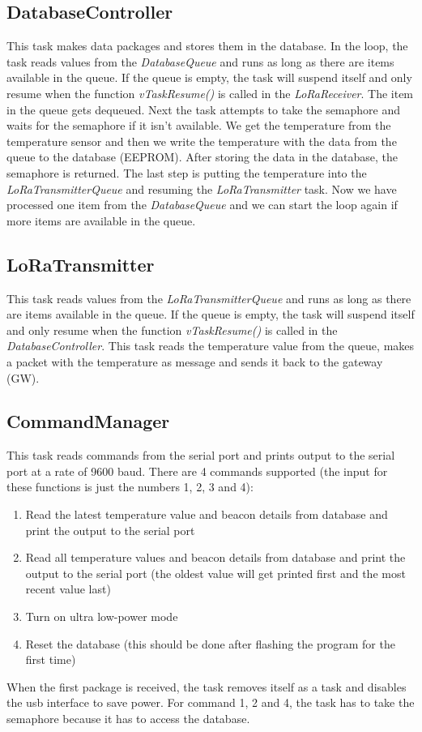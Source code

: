 \documentclass{scrartcl}
\begin{document}
\subsection{DatabaseController}
This task makes data packages and stores them in the database.
In the loop, the task reads values from the \textit{DatabaseQueue} and runs as long as there are items available in the queue.
If the queue is empty, the task will suspend itself and only resume when the function \textit{vTaskResume()} is called in the \textit{LoRaReceiver}.
The item in the queue gets dequeued. Next the task attempts to take the semaphore and waits for the semaphore if it isn't available.
We get the temperature from the temperature sensor and then we write the temperature with the data from the queue to the database (EEPROM).
After storing the data in the database, the semaphore is returned.
The last step is putting the temperature into the \textit{LoRaTransmitterQueue} and resuming the \textit{LoRaTransmitter} task.
Now we have processed one item from the \textit{DatabaseQueue} and we can start the loop again if more items are available in the queue.

\newpage

\subsection{LoRaTransmitter}
This task reads values from the \textit{LoRaTransmitterQueue} and runs as long as there are items available in the queue.
If the queue is empty, the task will suspend itself and only resume when the function \textit{vTaskResume()} is called in the \textit{DatabaseController}.
This task reads the temperature value from the queue, makes a packet with the temperature as message and sends it back to the gateway (GW).

\subsection{CommandManager}
This task reads commands from the serial port and prints output to the serial port at a rate of 9600 baud.
There are 4 commands supported (the input for these functions is just the numbers 1, 2, 3 and 4):
\begin{enumerate}
    \item Read the latest temperature value and beacon details from database and print the output to the serial port
    \item Read all temperature values and beacon details from database and print the output to the serial port
        (the oldest value will get printed first and the most recent value last)
    \item Turn on ultra low-power mode
    \item Reset the database (this should be done after flashing the program for the first time)
\end{enumerate}
When the first package is received, the task removes itself as a task and disables the usb interface to save power.
For command 1, 2 and 4, the task has to take the semaphore because it has to access the database.
\end{document}

